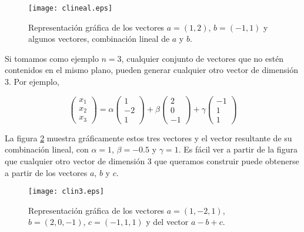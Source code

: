 \begin{figure}[h]
\centering
\texttt{[image: clineal.eps]}
\caption{Representación gráfica de los vectores $a=(1,2)
$, $b=(-1,1)
$ y algunos vectores, combinación lineal de $a$ y $b$.}
\label{fig:clineal}
\end{figure}
\begin{paracol}{2}
Si tomamos como ejemplo $n=3$, cualquier conjunto de vectores que no estén contenidos en el mismo plano, pueden generar cualquier otro vector de dimensión $3$. Por ejemplo,
\end{paracol}
\begin{equation*}
\begin{pmatrix}
x_1\\
x_2\\
x_3
\end{pmatrix}=\alpha \begin{pmatrix}
1\\
-2\\
1
\end{pmatrix}+ \beta \begin{pmatrix}
2\\
0\\
-1
\end{pmatrix}+ \gamma \begin{pmatrix}
-1\\
1\\
1
\end{pmatrix}
\end{equation*}
\begin{paracol}{2}
La figura \ref{fig:clin3} muestra gráficamente estos tres vectores y el vector resultante de su combinación lineal, con $\alpha=1$, $\beta=-0.5$ y $\gamma=1$.  Es fácil ver a partir de la figura que cualquier otro vector de dimensión $3$ que queramos construir puede obtenerse a partir de los vectores $a$, $b$ y $c$.
\end{paracol}
\begin{figure}[h]
\centering
\texttt{[image: clin3.eps]}
\caption{Representación gráfica de los vectores $a=(1,-2,1)
$, $b=(2,0,-1)$, $c=(-1,1,1)$ y del vector $a-b+c$.}
\label{fig:clin3}
\end{figure}

